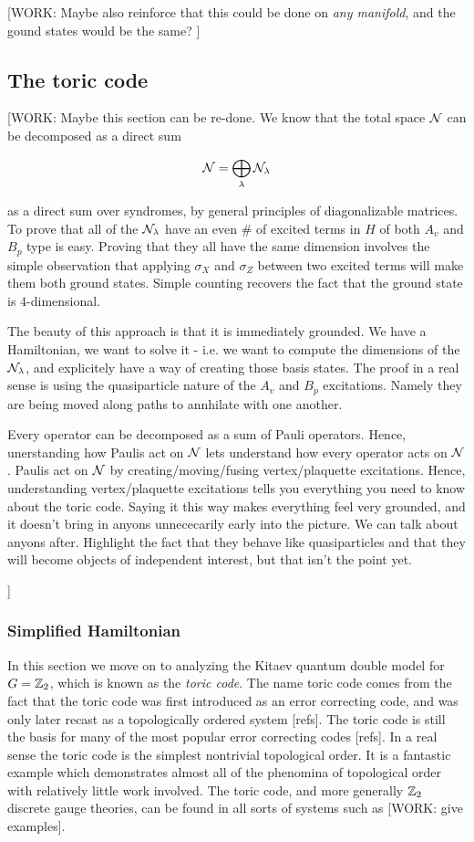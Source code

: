 [WORK: Maybe also reinforce that this could be done on \textit{any manifold}, and the gound states would be the same? ]

\subsection{The toric code}

[WORK: Maybe this section can be re-done. We know that the total space $\mathcal{N}$ can be decomposed as a direct sum

$$\mathcal{N}=\bigoplus_{\lambda}\mathcal{N}_\lambda$$

as a direct sum over syndromes, by general principles of diagonalizable matrices. To prove that all of the $\mathcal{N}_\lambda$  have an even $\#$ of excited terms in $H$ of both $A_v$ and $B_p$ type is easy. Proving that they all have the same dimension involves the simple observation that applying $\sigma_X$ and $\sigma_Z$ between two excited terms will make them both ground states. Simple counting recovers the fact that the ground state is $4$-dimensional.

The beauty of this approach is that it is immediately grounded. We have a Hamiltonian, we want to solve it - i.e. we want to compute the dimensions of the $\mathcal{N}_\lambda$, and explicitely have a way of creating those basis states. The proof in a real sense is using the quasiparticle nature of the $A_v$ and $B_p$ excitations. Namely they are being moved along paths to annhilate with one another.

Every operator can be decomposed as a sum of Pauli operators. Hence, unerstanding how Paulis act on $\mathcal{N}$ lets understand how every operator acts on $\mathcal{N}$. Paulis act on $\mathcal{N}$ by creating/moving/fusing vertex/plaquette excitations. Hence, understanding vertex/plaquette excitations tells you everything you need to know about the toric code. Saying it this way makes everything feel very grounded, and it doesn't bring in anyons unnececarily early into the picture. We can talk about anyons after. Highlight the fact that they behave like quasiparticles and that they will become objects of independent interest, but that isn't the point yet.

]

\subsubsection{Simplified Hamiltonian}

In this section we move on to analyzing the Kitaev quantum double model for $G=\mathbb{Z}_2$, which is known as the \textit{toric code}. The name toric code comes from the fact that the toric code was first introduced as an error correcting code, and was only later recast as a topologically ordered system [refs]. The toric code is still the basis for many of the most popular error correcting codes [refs]. In a real sense the toric code is the simplest nontrivial topological order. It is a fantastic example which demonstrates almost all of the phenomina of topological order with relatively little work involved. The toric code, and more generally $\mathbb{Z}_2$ discrete gauge theories, can be found in all sorts of systems such as [WORK: give examples]. 

